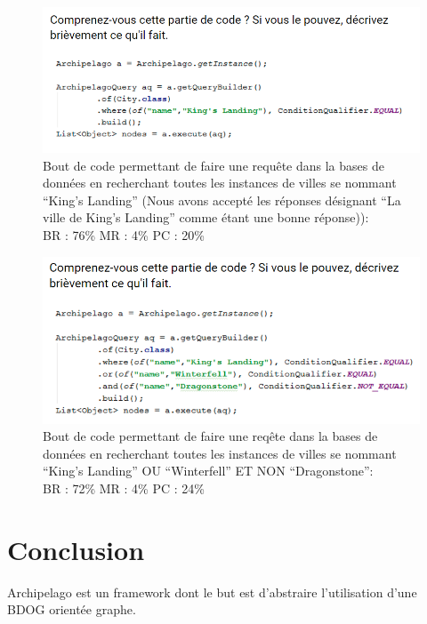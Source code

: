 \documentclass[a4paper,fleqn,12pt,oneside]{report}
\begin{document}
\begin{figure}[!ht]
\centering
\includegraphics[scale=1]{figures/Snippet3.png}
\caption{Bout de code permettant de faire une requête dans la bases de données en recherchant toutes les instances de villes se nommant \enquote{King's Landing} (Nous avons accepté les réponses désignant \enquote{La ville de King's Landing} comme étant une bonne réponse)):\\BR : 76\% MR : 4\% PC : 20\% }
\label{fig:Snippet3}
\end{figure}

\begin{figure}[!ht]
\centering
\includegraphics[scale=1]{figures/Snippet4.png}
\caption{Bout de code permettant de faire une reqête dans la bases de données en recherchant toutes les instances de villes se nommant \enquote{King's Landing} OU \enquote{Winterfell} ET NON \enquote{Dragonstone}:\\BR : 72\% MR : 4\% PC : 24\% }
\label{fig:Snippet4}
\end{figure}

\chapter{Conclusion}

Archipelago est un framework dont le but est d'abstraire l'utilisation d'une BDOG orientée graphe. 
\end{document}
